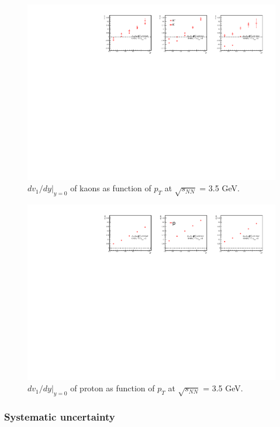\begin{figure}[hbt!]
\centering
\includegraphics[width=0.95\linewidth]{figures/chapter03/3p5gev_kaonp_v1Slope_pT.pdf}
\caption{$dv_1/dy|_{y=0}$ of kaons as function of $p_T$ at $\sqrt{s_{NN}}$ = 3.5 GeV.}
\label{fig:3p5gev_kaon_v1Slope_pt}
\end{figure}

\begin{figure}[hbt!]
\centering
\includegraphics[width=0.95\linewidth]{figures/chapter03/3p5gev_protonp_v1Slope_pT.pdf}
\caption{$dv_1/dy|_{y=0}$ of proton as function of $p_T$ at $\sqrt{s_{NN}}$ = 3.5 GeV.}
\label{fig:3p5gev_proton_v1Slope_pt}
\end{figure}
    

\subsubsection{Systematic uncertainty}

